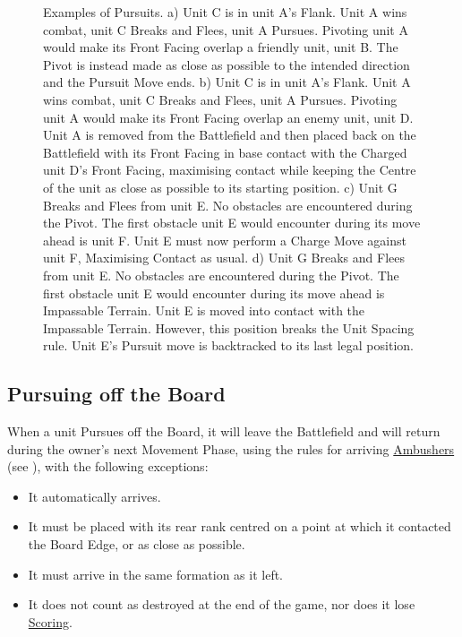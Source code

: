 \begin{figure}[!htbp]
	\renewcommand{\figbiglettersize}{17}
	\begin{minipage}{0.53\textwidth}
	\def\svgwidth{\textwidth}
	
	\end{minipage}\hfill\begin{minipage}{0.44\textwidth}
	\caption{Examples of Pursuits.\captionpar
	a) Unit C is in unit A's Flank. Unit A wins combat, unit C Breaks and Flees, unit A Pursues. Pivoting unit A would make its Front Facing overlap a friendly unit, unit B. The Pivot is instead made as close as possible to the intended direction and the Pursuit Move ends.\vspace*{1.5cm}\captionpar
	b) Unit C is in unit A's Flank. Unit A wins combat, unit C Breaks and Flees, unit A Pursues. Pivoting unit A would make its Front Facing overlap an enemy unit, unit D. Unit A is removed from the Battlefield and then placed back on the Battlefield with its Front Facing in base contact with the Charged unit D's Front Facing, maximising contact while keeping the Centre of the unit as close as possible to its starting position.\vspace*{3.5cm}\captionpar
	c) Unit G Breaks and Flees from unit E. No obstacles are encountered during the Pivot. The first obstacle unit E would encounter during its move ahead is unit F. Unit E must now perform a Charge Move against unit F, Maximising Contact as usual.\vspace*{4cm}\captionpar
	d) Unit G Breaks and Flees from unit E. No obstacles are encountered during the Pivot. The first obstacle unit E would encounter during its move ahead is Impassable Terrain. Unit E is moved into contact with the Impassable Terrain. However, this position breaks the Unit Spacing rule. Unit E's Pursuit move is backtracked to its last legal position.\vspace*{1cm}}
	\label{figure/pursuit}
	\end{minipage}
\end{figure}

\clearpage
\subsection{Pursuing off the Board}
\label{pursuing_off_the_board}

When a unit Pursues off the Board, it will leave the Battlefield and will return during the owner's next Movement Phase, using the rules for arriving \hyperref[ambush]{Ambushers} (see ), with the following exceptions:
\begin{itemize}
\item It automatically arrives.
\item It must be placed with its rear rank centred on a point at which it contacted the Board Edge, or as close as possible.
\item It must arrive in the same formation as it left.
\item It does not count as destroyed at the end of the game, nor does it lose \hyperref[scoring]{Scoring}.
\end{itemize}

